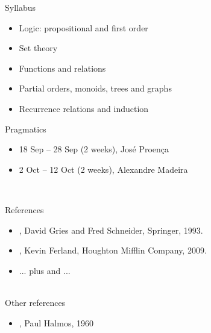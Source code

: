 \documentclass{beamer}
\begin{document}
\begin{slide}{Syllabus}
\begin{itemize}
\item Logic: propositional and first order
\item Set theory
\item Functions and relations
\item Partial orders, monoids, trees and graphs
\item Recurrence relations and induction
\end{itemize}
\end{slide}


\begin{slide}{Pragmatics}
  \begin{itemize}
    \item 18 Sep -- 28 Sep (2 weeks), Jos\'{e} Proen\c{c}a
    \item 2 Oct -- 12 Oct (2 weeks), Alexandre Madeira
  \end{itemize}
  ~\\[5mm]
\end{slide}

\begin{slide}{References}
\begin{itemize}
\item {}, David Gries and Fred Schneider, Springer, 1993.
\item {}, Kevin Ferland, Houghton Mifflin Company, 2009.
\item ... plus  and  ...
\end{itemize}

~\\[5mm]

Other references
\begin{itemize}
  \item {}, Paul Halmos, 1960
\end{itemize}

~\\[3mm]


\end{slide}
\end{document}
